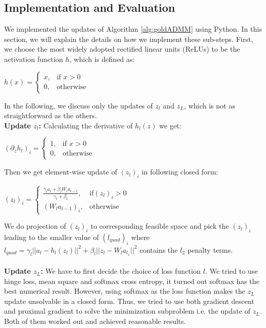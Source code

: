 \documentclass[letterpaper, 10 pt, conference]{ieeeconf}  %
\begin{document}
\subsection{Implementation and Evaluation}
We implemented the updates of  Algorithm \ref{alg:goldADMM} using Python. In this section, we will explain the details on how we implement these sub-steps. First, we choose the most widely adopted rectified linear units (ReLUs) to be the activation function $h$, which is defined as:
\begin{center}
$h(x) = \begin{cases} x, & \mbox{if } x> 0 \\0, & \mbox{otherwise }\end{cases} $
\end{center}

In the following, we discuss only the updates of $z_l$ and $z_L$, which is not as straightforward as the others.\\
\textbf{Update $z_l$:  }  Calculating the derivative of $h_l(z)$  we get:
\begin{center}
$(\partial_z h_l)_i = \begin{cases} 1, & \mbox{if } x> 0 \\0, & \mbox{otherwise }\end{cases} $
\end{center}
Then we get element-wise update of $(z_l)_i$ in following closed form:
\begin{center}
$(z_l)_i = \begin{cases} \frac{\gamma_la_l + \beta_lW_la_{l-1}}{\gamma_l + \beta_l}, & \mbox{if} (z_l)_i> 0 \\(W_la_{l-1})_i, & \mbox{otherwise}\end{cases} $
\end{center}
We do projection of $(z_l)_i$ to corresponding feasible space and pick the $(z_l)_i$ leading to the smaller value of $(l_{quad})_i$ where $l_{quad} = \gamma_l||a_l - h_l(z_l)||^2 + \beta_l||z_l - W_la_{l_1}||^2$ contains the $l_2$ penalty terms. \\\\
\textbf{Update $z_L$:  }  We have to first decide the choice of loss function $l$. We tried to use hinge loss, mean square and softmax cross entropy, it turned out softmax has the best numerical result. However, using softmax as the loss function makes the $z_L$ update unsolvable in a closed form. Thus, we tried to use both gradient descent and proximal gradient to solve the minimization subproblem i.e. the update of $z_L$. Both of them worked out and achieved reasonable results. 
\end{document}
